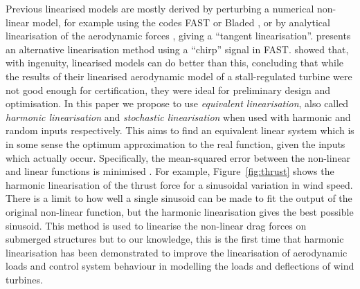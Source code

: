 \documentclass[preprint]{elsarticle}
\begin{document}
Previous linearised models are mostly derived by perturbing a numerical
non-linear model, for example using the codes FAST \citep{jonkman_fast_2016} or
Bladed \citep{GarradHassan2011}, or by analytical linearisation of the
aerodynamic forces \citep{Lee2005}, giving a ``tangent linearisation''.
\citet{olondriz_alternative_2018} presents an alternative linearisation method
using a ``chirp'' signal in FAST. \citet{merz_simple_2012} showed that, with
ingenuity, linearised models can do better than this, concluding that while the
results of their linearised aerodynamic model of a stall-regulated turbine were
not good enough for certification, they were ideal for preliminary design and
optimisation. In this paper we propose to use \emph{equivalent linearisation},
also called \emph{harmonic linearisation} and \emph{stochastic linearisation}
when used with harmonic and random inputs respectively. This aims to find an
equivalent linear system which is in some sense the optimum approximation to the
real function, given the inputs which actually occur. Specifically, the
mean-squared error between the non-linear and linear functions is minimised
\citep{Vidyasagar1993}. For example, Figure~\ref{fig:thrust} shows the harmonic
linearisation of the thrust force for a sinusoidal variation in wind speed.
There is a limit to how well a single sinusoid can be made to fit the output of
the original non-linear function, but the harmonic linearisation gives the best
possible sinusoid. This method is used to linearise the non-linear drag forces
on submerged structures \citep{Langley1984} but to our knowledge, this is the
first time that harmonic linearisation has been demonstrated to improve the
linearisation of aerodynamic loads and control system behaviour in modelling the
loads and deflections of wind turbines.
\end{document}
